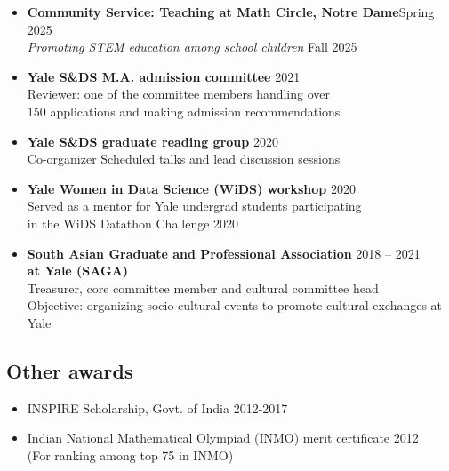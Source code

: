 \documentclass[letterpaper,12pt,oneside]{article}
\theoremstyle{definition}
\begin{document}
\begin{itemize}
				\item[] \textbf{Community Service: Teaching at Math Circle, Notre Dame}\hfill Spring 2025\\
				{\it Promoting STEM education among school children} \hfill Fall 2025
				
				
				\item[] {\bf Yale S\&DS M.A. admission committee} \hfill 2021\\
				Reviewer: one of the committee members
				handling over\\ 150 applications
				and making admission recommendations
				
				\item[] {\bf Yale S\&DS graduate reading group} \hfill 2020\\
				Co-organizer
				Scheduled talks and lead discussion sessions
				
				\item[] {\bf Yale Women in Data Science (WiDS) workshop} \hfill 2020\\
				Served as a mentor for Yale undergrad students participating \\
				in the
				{WiDS Datathon Challenge 2020}
				
				\item[] {\bf South Asian Graduate and Professional Association} \hfill 2018 -- 2021\\
				{\bf at Yale (SAGA)}\\
				Treasurer, core committee member and cultural committee head\\
				Objective: organizing socio-cultural events to promote cultural exchanges at Yale
				
				
			\end{itemize}
			
			\subsection*{Other awards}
			\begin{itemize}
				\item [] INSPIRE Scholarship, Govt. of India \hfill 2012-2017
				\item [] Indian National Mathematical Olympiad (INMO) merit certificate \hfill 2012\\
				(For ranking among top 75 in INMO)
			\end{itemize}
			
\end{document}
